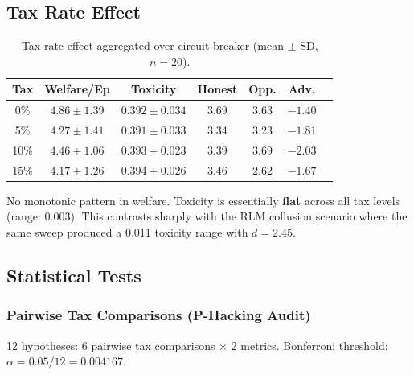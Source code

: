 \documentclass[11pt]{article}
\begin{document}
\subsection{Tax Rate Effect}

\begin{table}[H]
\centering
\caption{Tax rate effect aggregated over circuit breaker (mean $\pm$ SD, $n = 20$).}
\small
\begin{tabular}{@{}ccccccc@{}}
\toprule
Tax & Welfare/Ep & Toxicity & Honest & Opp. & Adv. \\
\midrule
0\% & $4.86 \pm 1.39$ & $0.392 \pm 0.034$ & 3.69 & 3.63 & $-1.40$ \\
5\% & $4.27 \pm 1.41$ & $0.391 \pm 0.033$ & 3.34 & 3.23 & $-1.81$ \\
10\% & $4.46 \pm 1.06$ & $0.393 \pm 0.023$ & 3.39 & 3.69 & $-2.03$ \\
15\% & $4.17 \pm 1.26$ & $0.394 \pm 0.026$ & 3.46 & 2.62 & $-1.67$ \\
\bottomrule
\end{tabular}
\end{table}

No monotonic pattern in welfare. Toxicity is essentially \textbf{flat} across all tax levels (range: 0.003). This contrasts sharply with the RLM collusion scenario where the same sweep produced a 0.011 toxicity range with $d = 2.45$.

\subsection{Statistical Tests}

\subsubsection{Pairwise Tax Comparisons (P-Hacking Audit)}

12 hypotheses: 6 pairwise tax comparisons $\times$ 2 metrics. Bonferroni threshold: $\alpha = 0.05/12 = 0.004167$.
\end{document}
